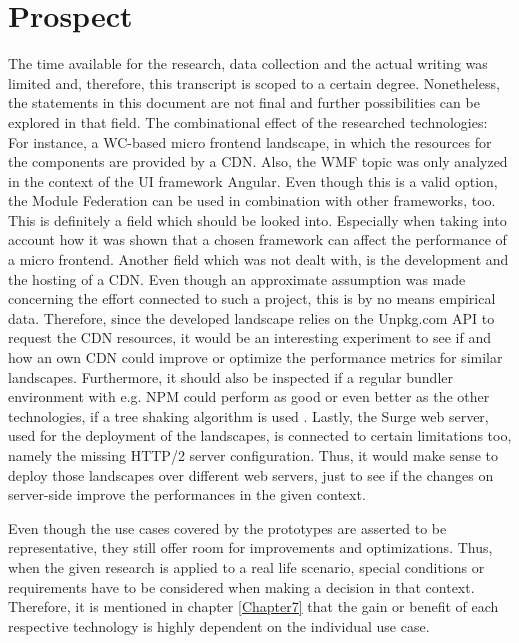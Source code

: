 \chapter{Prospect} %
\label{Chapter9}


The time available for the research, data collection and the actual writing was limited and, therefore, this transcript is scoped to a certain degree. 
Nonetheless, the statements in this document are not final and further possibilities can be explored in that field. 
The combinational effect of the researched technologies: For instance, a WC-based micro frontend landscape, in which the resources for the components are provided by a CDN. 
Also, the WMF topic was only analyzed in the context of the UI framework Angular. 
Even though this is a valid option, the Module Federation can be used in combination with other frameworks, too. 
This is definitely a field which should be looked into. 
Especially when taking into account how it was shown that a chosen framework can affect the performance of a micro frontend. 
Another field which was not dealt with, is the development and the hosting of a CDN. 
Even though an approximate assumption was made concerning the effort connected to such a project, this is by no means empirical data. 
Therefore, since the developed landscape relies on the Unpkg.com API to request the CDN resources, it would be an interesting experiment to see if and how an own CDN could improve or optimize the performance metrics for similar landscapes.
Furthermore, it should also be inspected if a regular bundler environment with e.g. NPM could perform as good or even better as the other technologies, if a tree shaking algorithm is used \cite{treeshaking}.
Lastly, the Surge web server, used for the deployment of the landscapes, is connected to certain limitations too, namely the missing HTTP/2 server configuration. 
Thus, it would make sense to deploy those landscapes over different web servers, just to see if the changes on server-side improve the performances in the given context.

Even though the use cases covered by the prototypes are asserted to be representative, they still offer room for improvements and optimizations. Thus, when the given research is applied to a real life scenario, special conditions or requirements have to be considered when making a decision in that context. Therefore, it is mentioned in chapter \ref{Chapter7} that the gain or benefit of each respective technology is highly dependent on the individual use case. 

